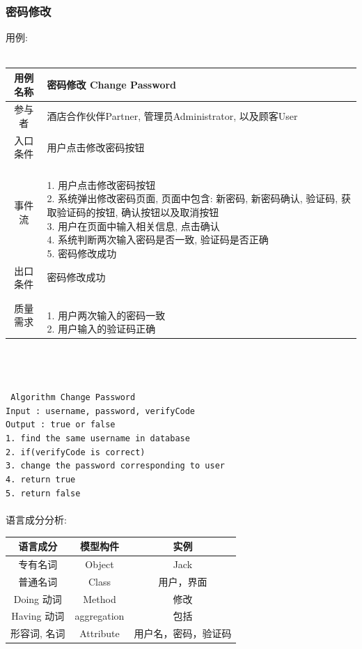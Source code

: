 \documentclass[11pt]{article}
\begin{document}
		\subsubsection{密码修改}
			用例: \\ \\
			\begin{tabular}{c|l}
			\hline
			用例名称 & 密码修改 Change Password \\ \hline
			参与者 & 酒店合作伙伴Partner, 管理员Administrator, 以及顾客User  \\ \hline
			入口条件 & 用户点击修改密码按钮 \\ \hline
			事件流 & 	\parbox{33em}{\ \\
						1. 用户点击修改密码按钮 \\
						2. 系统弹出修改密码页面, 页面中包含: 新密码, 新密码确认, 验证码, 获取验证码的按钮, 确认按钮以及取消按钮\\
						3. 用户在页面中输入相关信息, 点击确认  \\
						4. 系统判断两次输入密码是否一致, 验证码是否正确 \\
						5. 密码修改成功 \\
						} \\ \hline
			出口条件 & 密码修改成功 \\ \hline
			质量需求 & \parbox{33em}{\ \\
						1. 用户两次输入的密码一致 \\
						2. 用户输入的验证码正确 \\
						} \\ \hline
			\end{tabular}\\ \\ \\
			\texttt{
			Algorithm Change Password \\
			Input : username, password, verifyCode \\
			Output : true or false \\
			1. find the same username in database \\
			2. if(verifyCode is correct) \\
			3.     change the password corresponding to user \\
			4.     return true \\
			5. return false \\
			} \\
			
			语言成分分析:
			\begin{center}
			\begin{tabular}{|c|c|c|}
			\hline
			语言成分 & 模型构件 & 实例\\ \hline
			专有名词 & Object & Jack  \\ \hline
			普通名词 & Class & 用户，界面 \\ \hline
			Doing 动词 & Method &  修改 \\ \hline
			Having 动词 & aggregation & 包括 \\ \hline
			形容词, 名词 & Attribute & 用户名，密码，验证码 \\ \hline
			\end{tabular}
			\end{center}
			
\end{document}
